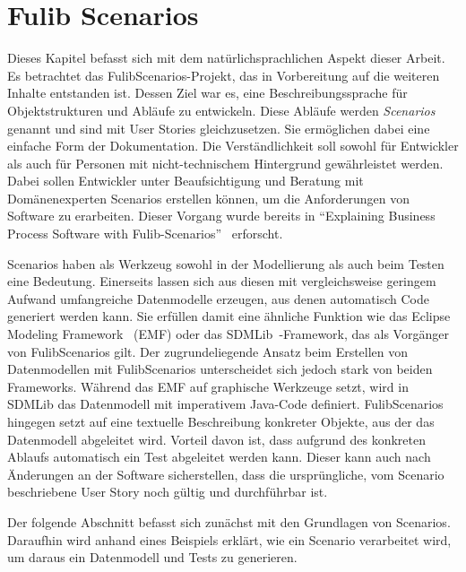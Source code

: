 \chapter{Fulib Scenarios}\label{ch:fulib-scenarios}

Dieses Kapitel befasst sich mit dem natürlichsprachlichen Aspekt dieser Arbeit.
Es betrachtet das FulibScenarios-Projekt, das in Vorbereitung auf die weiteren Inhalte entstanden ist.
Dessen Ziel war es, eine Beschreibungssprache für Objektstrukturen und Abläufe zu entwickeln.
Diese Abläufe werden \emph{Scenarios} genannt und sind mit User Stories gleichzusetzen.
Sie ermöglichen dabei eine einfache Form der Dokumentation.
Die Verständlichkeit soll sowohl für Entwickler als auch für Personen mit nicht-technischem Hintergrund gewährleistet werden.
Dabei sollen Entwickler unter Beaufsichtigung und Beratung mit Domänenexperten Scenarios erstellen können, um die Anforderungen von Software zu erarbeiten.
Dieser Vorgang wurde bereits in ``Explaining Business Process Software with Fulib-Scenarios''~\cite{explain} erforscht.

Scenarios haben als Werkzeug sowohl in der Modellierung als auch beim Testen eine Bedeutung.
Einerseits lassen sich aus diesen mit vergleichsweise geringem Aufwand umfangreiche Datenmodelle erzeugen, aus denen automatisch Code generiert werden kann.
Sie erfüllen damit eine ähnliche Funktion wie das Eclipse Modeling Framework~\cite{emf} (EMF) oder das SDMLib~\cite{networkparser}-Framework, das als Vorgänger von FulibScenarios gilt.
Der zugrundeliegende Ansatz beim Erstellen von Datenmodellen mit FulibScenarios unterscheidet sich jedoch stark von beiden Frameworks.
Während das EMF auf graphische Werkzeuge setzt, wird in SDMLib das Datenmodell mit imperativem Java-Code definiert.
FulibScenarios hingegen setzt auf eine textuelle Beschreibung konkreter Objekte, aus der das Datenmodell abgeleitet wird.
Vorteil davon ist, dass aufgrund des konkreten Ablaufs automatisch ein Test abgeleitet werden kann.
Dieser kann auch nach Änderungen an der Software sicherstellen, dass die ursprüngliche, vom Scenario beschriebene User Story noch gültig und durchführbar ist.

Der folgende Abschnitt befasst sich zunächst mit den Grundlagen von Scenarios.
Daraufhin wird anhand eines Beispiels erklärt, wie ein Scenario verarbeitet wird, um daraus ein Datenmodell und Tests zu generieren.



